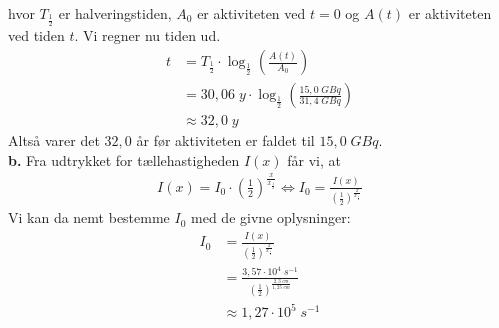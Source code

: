 \documentclass{report}
\begin{document}
hvor $T_{\frac{1}{2}}$ er halveringstiden, $A_0$ er aktiviteten ved $t=0$ og $A(t)$ er aktiviteten ved tiden $t$.
Vi regner nu tiden ud.
\begin{equation*}
\begin{split}
  t&= T_{\frac{1}{2}} \cdot \log_{\frac{1}{2}} \left(\frac{A(t)}{A_0}\right) \\ 
  &=30,06 \;\unit{y} \cdot \log_{\frac{1}{2}} \left(\frac{15,0 \;\unit{GBq} }{31,4 \;\unit{GBq} }\right) \\ 
  &\approx 32,0 \;\unit{y} 
\end{split}
\end{equation*}
Altså varer det $32,0$ år før aktiviteten er faldet til $15,0 \;\unit{GBq} $. \\[1ex]
\textbf{b.}
Fra udtrykket for tællehastigheden $I(x)$ får vi, at 
\begin{equation*}
\begin{split}
  I(x)=I_0 \cdot\left(\frac{1}{2}\right)^{\frac{x}{x_{\frac{1}{2}}}} \iff I_0=\frac{I(x)}{\left(\frac{1}{2}\right)^{\frac{x}{x_{\frac{1}{2}}}} }
\end{split}
\end{equation*}
Vi kan da nemt bestemme $I_0$ med de givne oplysninger: 
\begin{equation*}
\begin{split}
  I_0&=\frac{I(x)}{\left(\frac{1}{2}\right)^{\frac{x}{x_{\frac{1}{2}}}} }\\ 
  &=\frac{3,57 \cdot 10^4 \;\unit{s^{-1}} }{\left(\frac{1}{2}\right)^{\frac{2,3 \;\unit{cm} }{1,25 \;\unit{cm} }}}\\ 
  &\approx 1,27 \cdot 10^5 \;\unit{s^{-1}}  
\end{split}
\end{equation*}
\end{document}
